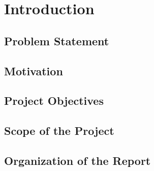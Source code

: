 \chapter{Introduction} 
\section{Problem Statement}
\section{Motivation}
\section{Project Objectives}
\section{Scope of the Project}

\section{Organization of the Report}

